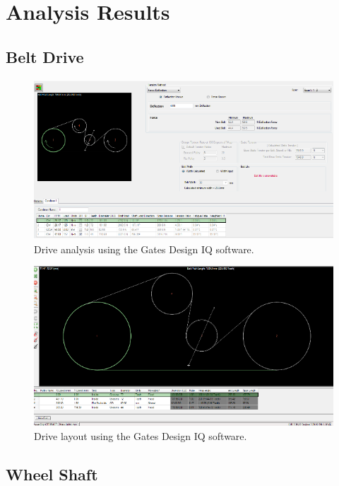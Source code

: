 \section{Analysis Results}

\subsection{Belt Drive}\label{sec:bd_fea}

\begin{figure}[H]
\centering
\includegraphics[width=\textwidth]{images/drive_analysis}
\caption[Drive Analysis]{Drive analysis using the Gates Design IQ software.}
\label{fig:drive_analysis}
\end{figure}

\begin{figure}[H]
\centering
\includegraphics[width=\textwidth]{images/drive_layout}
\caption[Drive Layout]{Drive layout using the Gates Design IQ software.}
\label{fig:drive_layout}
\end{figure}

\subsection{Wheel Shaft}\label{sec:ws_fea}

